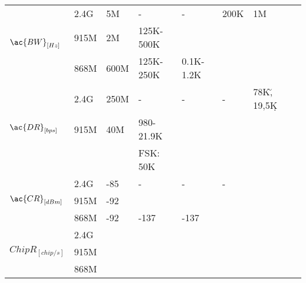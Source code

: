 \begin{longtable}{l|l|l|l|l|l|l|l}
	\multirow{3}{*}{$\ac{BW}_{[Hz]}$}  & 2.4G             & 5M           & -                & -             & 200K        & 1M                 & \ko             \\
	\                                  & 915M             & 2M           & 125K-500K        & \ko           & \ko         & \ko                & \ko             \\
	\                                  & 868M             & 600M         & 125K-250K        & 0.1K-1.2K     & \ko         & \ko                & \ko             \\\hline
	\multirow{3}{*}{$\ac{DR}_{[bps]}$} & 2.4G             & 250M         & -                & -             & -           & 78K\u, 19,5K\d     & \ko             \\
	\                                  & 915M             & 40M          & 980-21.9K        & \ko           & \ko         & \ko                & \ko             \\
	\                                  &                  &              & FSK:	50K         &               &             &                    &                 \\\hline
	\multirow{3}{*}{$\ac{CR}_{[dBm]}$} & 2.4G             & -85          & -                & -             & -           & \ko                & \ko             \\
	\                                  & 915M             & -92          & \ko              & \ko           & \ko         & \ko                & \ko             \\
	\                                  & 868M             & -92          & -137             & -137          & \ko         & \ko                & \ko             \\\hline
	\multirow{3}{*}{$Chip R_{[chip/s]}$} & 2.4G           &              &                  &               &             &                    &                 \\
	\                                  & 915M             &              &        	        &               &             &                    &                 \\
	\                                  & 868M             &              &                  &               &             &                    &                 \\\hline

\end{longtable}
